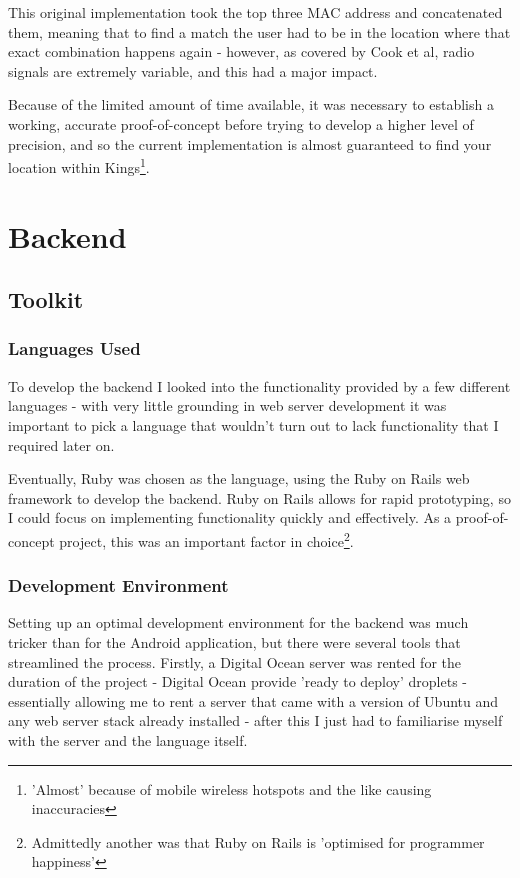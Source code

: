 \documentclass[11pt]{informatics-report}
\begin{document}
This original implementation took the top three MAC address and concatenated them, meaning that to find a match the user had to be in the location where that exact combination happens again - however, as covered by Cook et al, radio signals are extremely variable\cite{cook2005indoor}, and this had a major impact. 

Because of the limited amount of time available, it was necessary to establish a working, accurate proof-of-concept before trying to develop a higher level of precision, and so the current implementation is almost guaranteed to find your location within Kings\footnote{ 'Almost' because of mobile wireless hotspots and the like causing inaccuracies }. 

\section{Backend}

\subsection{Toolkit}

\subsubsection{Languages Used}

To develop the backend I looked into the functionality provided by a few different languages - with very little grounding in web server development it was important to pick a language that wouldn't turn out to lack functionality that I required later on.

Eventually, Ruby was chosen as the language, using the Ruby on Rails web framework to develop the backend. Ruby on Rails allows for rapid prototyping, so I could focus on implementing functionality quickly and effectively. As a proof-of-concept project, this was an important factor in choice\footnote{Admittedly another was that Ruby on Rails is 'optimised for programmer happiness'}.

\subsubsection{Development Environment}

Setting up an optimal development environment for the backend was much tricker than for the Android application, but there were several tools that streamlined the process. Firstly, a Digital Ocean server was rented for the duration of the project - Digital Ocean provide 'ready to deploy' droplets - essentially allowing me to rent a server that came with a version of Ubuntu and any web server stack already installed - after this I just had to familiarise myself with the server and the language itself.
\end{document}
